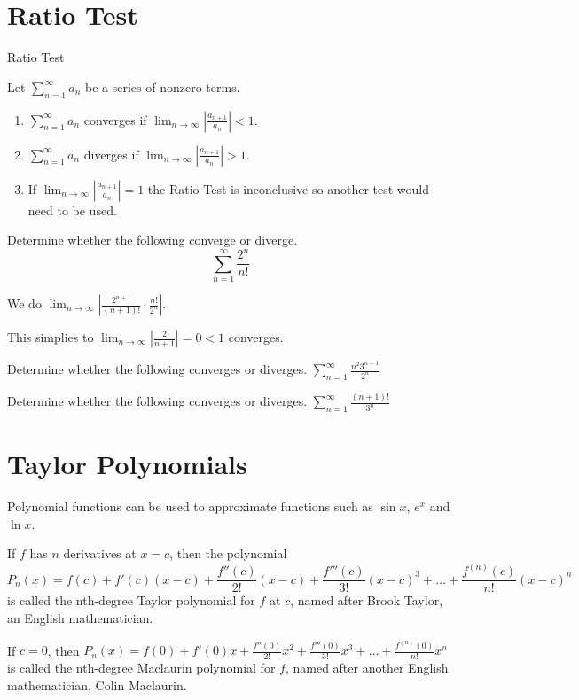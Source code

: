 \documentclass[../bccalc.tex]{subfiles}
\begin{document}
\section{Ratio Test}
Ratio Test 

Let $\sum_{n=1}^{\infty}a_n$ be a series of nonzero terms.
\begin{enumerate}
    \item $\sum_{n=1}^{\infty}a_n$ converges if $\lim_{n\to\infty}\left|\frac{a_{n+1}}{a_n}\right|<1$.
    \item $\sum_{n=1}^{\infty}a_n$ diverges if $\lim_{n\to\infty}\left|\frac{a_{n+1}}{a_n}\right|>1$.
    \item If $\lim_{n\to\infty}\left|\frac{a_{n+1}}{a_n}\right|=1$ the Ratio Test is inconclusive so another test would need to be used.
\end{enumerate}

\begin{example}
    Determine whether the following converge or diverge.
    \[ \sum_{n=1}^{\infty}\frac{2^n}{n!} \]

    We do $\lim_{n\to\infty}\left| \frac{2^{n+1}}{(n+1)!}\cdot \frac{n!}{2^n} \right|$.

    This simplies to $\lim_{n\to\infty}\left|\frac{2}{n+1}\right|=0<1$ converges.
\end{example}

\ex Determine whether the following converges or diverges. $\sum_{n=1}^{\infty}\frac{n^2 3^{n+1}}{2^n}$

\ex Determine whether the following converges or diverges. $\sum_{n=1}^{\infty}\frac{(n+1)!}{3^n}$

\section{Taylor Polynomials}
Polynomial functions can be used to approximate functions such as $\sin x$, $e^x$ and $\ln x$.

\begin{definition}
    If $f$ has $n$ derivatives at $x=c$, then the polynomial 
    \[ P_n(x)=f(c)+f'(c)(x-c)+\frac{f''(c)}{2!}(x-c)+\frac{f'''(c)}{3!}(x-c)^3+\dots+\frac{f^{(n)}(c)}{n!}(x-c)^n\]
    is called the nth-degree Taylor polynomial for $f$ at $c$, named after Brook Taylor, an English mathematician.

    If $c=0$, then $P_n(x)=f(0)+f'(0)x+\frac{f''(0)}{2!}x^2+\frac{f'''(0)}{3!}x^3+\dots+\frac{f^{(n)}(0)}{n!}x^n$ is called the nth-degree Maclaurin polynomial for $f$, named after another English mathematician, Colin Maclaurin.
\end{definition}
\end{document}
